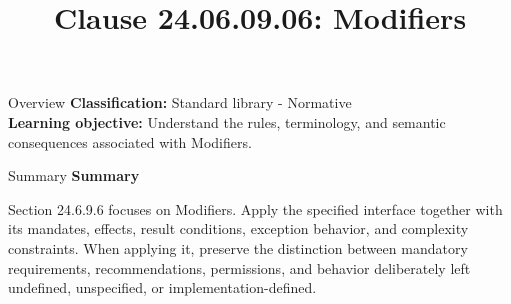 \documentclass[10pt,letterpaper]{article}
\title{Clause 24.06.09.06: Modifiers}
\author{}
\date{}
\begin{document}
\maketitle
\begin{CornellOverviewBox}{Overview}
\textbf{Classification:} Standard library - Normative\\[2pt]
\textbf{Learning objective:} Understand the rules, terminology, and semantic consequences associated with Modifiers.
\end{CornellOverviewBox}\begin{CornellSummaryBox}{Summary}
{\sffamily\bfseries\color{Accent} Summary}\par\vspace{3pt}Section 24.6.9.6 focuses on Modifiers. Apply the specified interface together with its mandates, effects, result conditions, exception behavior, and complexity constraints. When applying it, preserve the distinction between mandatory requirements, recommendations, permissions, and behavior deliberately left undefined, unspecified, or implementation-defined.
\end{CornellSummaryBox}
\end{document}
